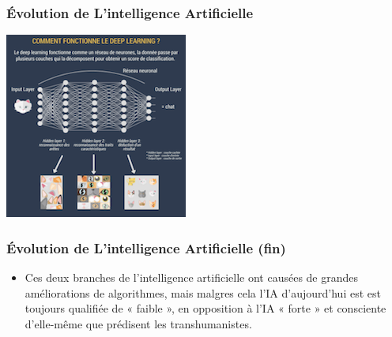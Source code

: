 \documentclass{beamer}
\begin{document}
	\begin{frame}[fragile]
	\frametitle{Évolution de L'intelligence  Artificielle}
	
	\centerline{\includegraphics{deeplearning.png}}%
	
	\end{frame}
	
		\begin{frame}[fragile]
	\frametitle{Évolution de L'intelligence  Artificielle (fin)}
	\begin{itemize}
		\item Ces deux branches de l'intelligence artificielle ont causées de grandes améliorations de 						algorithmes, mais malgres cela l'IA d'aujourd'hui est est toujours qualifiée de « faible », en opposition 			à l’IA « forte » et consciente d’elle-même que prédisent les transhumanistes.

	\end{itemize}
	\end{frame}
\end{document}

